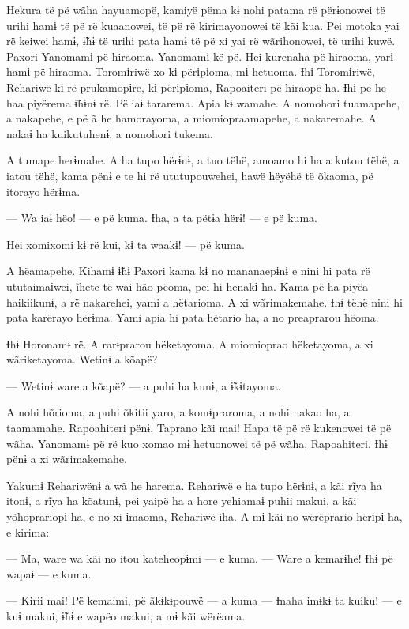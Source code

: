  

 

Hekura të pë wãha hayuamopë, kamiyë pëma kɨ nohi patama rë përɨonowei të
urihi hamɨ të pë rë kuaanowei, të pë rë kirimayonowei të kãi kua. Pei
motoka yai rë keiwei hamɨ, ɨ̃hɨ të urihi pata hamɨ të pë xi yai rë
wãrihonowei, të urihi kuwë. Paxori Yanomamɨ pë hiraoma. Yanomamɨ kë pë.
Hei kurenaha pë hiraoma, yarɨ hamɨ pë hiraoma. Toromɨriwë xo kɨ
përɨpɨoma, mɨ hetuoma. Ɨhɨ Toromɨriwë, Rehariwë kɨ rë prukamopɨre, kɨ
përɨpɨoma, Rapoaiteri pë hiraopë ha. Ɨhɨ pe he haa piyërema ɨ̃hɨnɨ rë. Pë
iaɨ tararema. Apia kɨ wamahe. A nomohori tuamapehe, a nakapehe, e pë ã
he hamorayoma, a miomiopraamapehe, a nakaremahe. A nakaɨ ha kuikutuhenɨ,
a nomohori tukema. 

A tumape herɨmahe. A ha tupo hërɨnɨ, a tuo tëhë, amoamo hi ha a kutou
tëhë, a iatou tëhë, kama pënɨ e te hi rë ututupouwehei, hawë hëyëhë të
õkaoma, pë itorayo hërɨma. 

— Wa iaɨ hëo! --- e pë kuma. Ɨha, a ta pëtɨa hërɨ! --- e pë kuma. 

Hei xomixomi kɨ rë kui, kɨ ta waakɨ! --- pë kuma. 

A hëamapehe. Kihamɨ ɨ̃hɨ Paxori kama kɨ no mananaepɨnɨ e nini hi pata rë
ututaimaɨwei, ĩhete të wai hão pëoma, pei hi henakɨ ha. Kama pë ha piyëa
haikiikunɨ, a rë nakarehei, yami a hëtarioma. A xi wãrimakemahe. Ɨhɨ
tëhë nini hi pata karërayo hërɨma. Yami apia hi pata hëtario ha, a no
preaprarou hëoma. 

Ɨhɨ Horonamɨ rë. A rarɨprarou hëketayoma. A miomioprao hëketayoma, a xi
wãriketayoma. Wetinɨ a kõapë? 

— Wetinɨ ware a kõapë? --- a puhi ha kunɨ, a ɨ̃kɨtayoma. 

A nohi hõrioma, a puhi õkitii yaro, a komɨpraroma, a nohi nakao ha, a
taamamahe. Rapoahiteri pënɨ. Taprano kãi mai! Hapa të pë rë kukenowei të
pë wãha. Yanomamɨ pë rë kuo xomao mɨ hetuonowei të pë wãha, Rapoahiteri.
Ɨhɨ pënɨ a xi wãrimakemahe. 

Yakumɨ Rehariwënɨ a wã he harema. Rehariwë e ha tupo hërɨnɨ, a kãi rĩya
ha itonɨ, a rĩya ha kõatunɨ, pei yaipë ha a hore yehiamaɨ puhii makui, a
kãi yõhoprariopɨ ha, e no xi ɨmaoma, Rehariwë iha. A mɨ kãi no
wërëprario hërɨpɨ ha, e kirima:

— Ma, ware wa kãi no itou kateheopɨmi --- e kuma. --- Ware a kemarɨhë!
Ɨhɨ pë wapaɨ --- e kuma. 

— Kirii mai! Pë kemaimi, pë ãkɨkɨpouwë --- a kuma --- Ɨnaha imɨkɨ ta
kuiku! --- e kuɨ makui, ɨ̃hɨ e wapëo makui, a mɨ kãi wërëama. 

